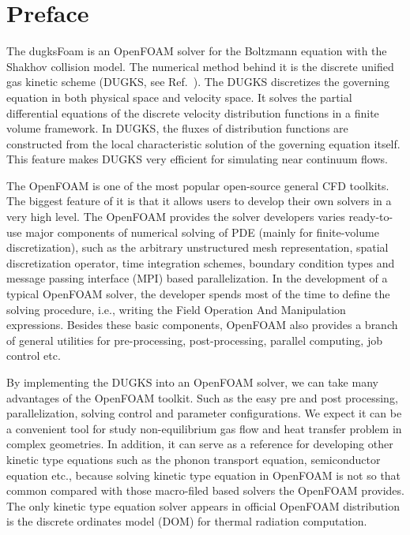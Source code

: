 

\chapter{Preface}

The dugksFoam is an OpenFOAM solver for the Boltzmann equation with the Shakhov collision model.
The numerical method behind it is the discrete unified gas kinetic scheme (DUGKS, see Ref.~\cite{guozl15}).
The DUGKS discretizes the governing equation in both physical space and velocity space.
It solves the partial differential equations of the discrete velocity distribution functions in a finite volume framework.
In DUGKS, the fluxes of distribution functions are constructed from the local characteristic solution of the governing equation itself.
This feature makes DUGKS very efficient for simulating near continuum flows.

The OpenFOAM is one of the most popular open-source general CFD toolkits.
The biggest feature of it is that it allows users to develop their own solvers in a very high level.
The OpenFOAM provides the solver developers varies ready-to-use major components of numerical solving of PDE (mainly for finite-volume discretization),
such as the arbitrary unstructured mesh representation, spatial discretization operator, time integration schemes,
boundary condition types and message passing interface (MPI) based parallelization.
In the development of a typical OpenFOAM solver,
the developer spends most of the time to define the solving procedure,
i.e., writing the Field Operation And Manipulation expressions.
Besides these basic components, OpenFOAM also provides a branch of general utilities for pre-processing,
post-processing, parallel computing, job control etc.

By implementing the DUGKS into an OpenFOAM solver, we can take many advantages of the OpenFOAM toolkit.
Such as the easy pre and post processing, parallelization, solving control and parameter configurations.
We expect it can be a convenient tool for study non-equilibrium gas flow and heat transfer problem in complex geometries.
In addition, it can serve as a reference for developing other kinetic type equations such as the phonon transport equation, semiconductor equation etc.,
because solving kinetic type equation in OpenFOAM is not so that common compared with those macro-filed based solvers the OpenFOAM provides.
The only kinetic type equation solver appears in official OpenFOAM distribution is the discrete ordinates model (DOM) for thermal radiation computation.

